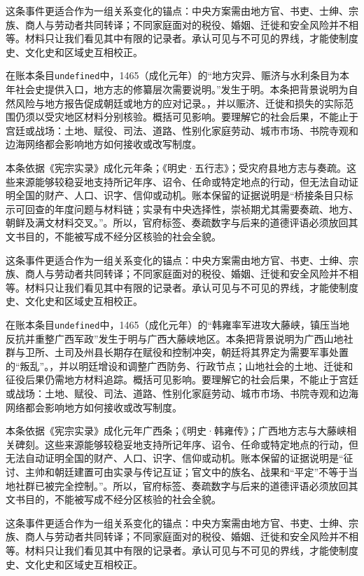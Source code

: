 这条事件更适合作为一组关系变化的锚点：中央方案需由地方官、书吏、士绅、宗族、商人与劳动者共同转译；不同家庭面对的税役、婚姻、迁徙和安全风险并不相等。材料只让我们看见其中有限的记录者。承认可见与不可见的界线，才能使制度史、文化史和区域史互相校正。

在账本条目\texttt{undefined}中，1465（成化元年）的“地方灾异、赈济与水利条目为本年社会史提供入口，地方志的修纂层次需要说明。”发生于明。本条把背景说明为自然风险与地方报告促成朝廷或地方的应对记录。，并以赈济、迁徙和损失的实际范围仍须以受灾地区材料分别核验。概括可见影响。要理解它的社会后果，不能止于宫廷或战场：土地、赋役、司法、道路、性别化家庭劳动、城市市场、书院寺观和边海网络都会影响地方如何接收或改写制度。

本条依据《宪宗实录》成化元年条；《明史·五行志》；受灾府县地方志与奏疏。这些来源能够较稳妥地支持所记年序、诏令、任命或特定地点的行动，但无法自动证明全国的财产、人口、识字、信仰或动机。账本保留的证据说明是“桥接条目只标示可回查的年度问题与材料链；实录有中央选择性，崇祯期尤其需要奏疏、地方、朝鲜及满文材料交叉。”。所以，官府标签、奏疏数字与后来的道德评语必须放回其文书目的，不能被写成不经分区核验的社会全貌。

这条事件更适合作为一组关系变化的锚点：中央方案需由地方官、书吏、士绅、宗族、商人与劳动者共同转译；不同家庭面对的税役、婚姻、迁徙和安全风险并不相等。材料只让我们看见其中有限的记录者。承认可见与不可见的界线，才能使制度史、文化史和区域史互相校正。

在账本条目\texttt{undefined}中，1465（成化元年）的“韩雍率军进攻大藤峡，镇压当地反抗并重整广西军政”发生于明与广西大藤峡地区。本条把背景说明为广西山地社群与卫所、土司及州县长期存在赋役和控制冲突，朝廷将其界定为需要军事处置的“叛乱”。，并以明廷增设和调整广西防务、行政节点；山地社会的土地、迁徙和征役后果仍需地方材料追踪。概括可见影响。要理解它的社会后果，不能止于宫廷或战场：土地、赋役、司法、道路、性别化家庭劳动、城市市场、书院寺观和边海网络都会影响地方如何接收或改写制度。

本条依据《宪宗实录》成化元年广西条；《明史·韩雍传》；广西地方志与大藤峡相关碑刻。这些来源能够较稳妥地支持所记年序、诏令、任命或特定地点的行动，但无法自动证明全国的财产、人口、识字、信仰或动机。账本保留的证据说明是“征讨、主帅和朝廷建置可由实录与传记互证；官文中的族名、战果和“平定”不等于当地社群已被完全控制。”。所以，官府标签、奏疏数字与后来的道德评语必须放回其文书目的，不能被写成不经分区核验的社会全貌。

这条事件更适合作为一组关系变化的锚点：中央方案需由地方官、书吏、士绅、宗族、商人与劳动者共同转译；不同家庭面对的税役、婚姻、迁徙和安全风险并不相等。材料只让我们看见其中有限的记录者。承认可见与不可见的界线，才能使制度史、文化史和区域史互相校正。

